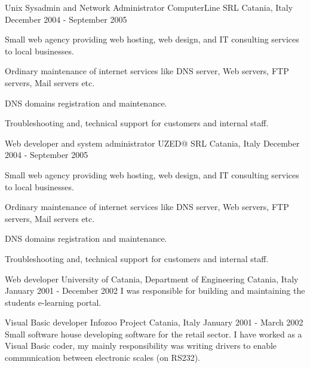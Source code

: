 \begin{cventries}
  \cventry
  {Unix Sysadmin and Network Administrator}
  {ComputerLine SRL}
  {Catania, Italy}
  {December 2004 - September 2005}
  {
    Small web agency providing web hosting, web design, and IT consulting services to local businesses.
    \begin{cvitems}
      \item Ordinary maintenance of internet services like DNS server, Web servers, FTP servers, Mail servers etc.
      \item DNS domains registration and maintenance.
      \item Troubleshooting and, technical support for customers and internal staff.
    \end{cvitems}
  }

  \cventry
  {Web developer and system administrator}
  {UZED@ SRL}
  {Catania, Italy}
  {December 2004 - September 2005}
  {
    Small web agency providing web hosting, web design, and IT consulting services to local businesses.
    \begin{cvitems}
      \item Ordinary maintenance of internet services like DNS server, Web servers, FTP servers, Mail servers etc.
      \item DNS domains registration and maintenance.
      \item Troubleshooting and, technical support for customers and internal staff.
    \end{cvitems}
  }

  \cventry
  {Web developer}
  {University of Catania, Department of Engineering}
  {Catania, Italy}
  {January 2001 - December 2002}
  {
    I was responsible for building and maintaining the students e-learning portal.
  }

  \cventry
  {Visual Basic developer}
  {Infozoo Project}
  {Catania, Italy}
  {January 2001 - March 2002}
  {
    Small software house developing software for the retail sector.
    I have worked as a Visual Basic coder, my mainly responsibility was writing drivers to enable
    communication between electronic scales (on RS232).
  }

\end{cventries}
